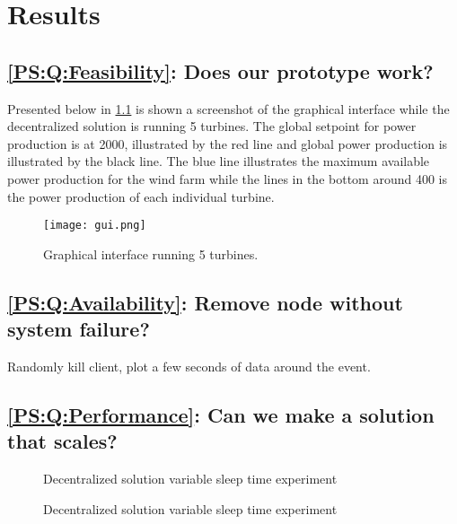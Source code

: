 
\chapter{Results}

\section{\ref{PS:Q:Feasibility}: Does our prototype work?}
Presented below in \cref{fig:graphicalInterface} is shown a screenshot of the graphical interface while the decentralized solution is running 5 turbines. The global setpoint for power production is at 2000, illustrated by the red line and global power production is illustrated by the black line. The blue line illustrates the maximum available power production for the wind farm while the lines in the bottom around 400 is the power production of each individual turbine.

\begin{figure} [!h]
	\centering
	\texttt{[image: gui.png]} 
	\caption[Graphical interface running 5 turbines]{
		\label{fig:graphicalInterface} 
		\footnotesize{%
			Graphical interface running 5 turbines.
		}
	}
\end{figure}


\section{\ref{PS:Q:Availability}: Remove node without system failure?}
Randomly kill client, plot a few seconds of data around the event.

\section{\ref{PS:Q:Performance}: Can we make a solution that scales?}

\begin{figure}
	
	\caption{Decentralized solution variable sleep time experiment}
	\label{fig:exp:decen:sleep}
\end{figure}

\begin{figure}
	
	\caption{Decentralized solution variable sleep time experiment}
	\label{fig:exp:decen:sleep2}
\end{figure}


